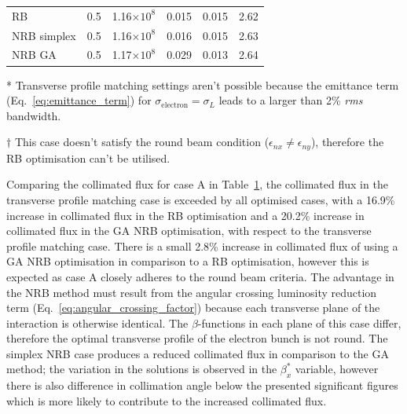 \documentclass[../main.tex]{subfiles}
\begin{document}
\begin{table}[!h]
{\begin{threeparttable}
\begin{tabular}{lccccc}
RB & 0.5 & 1.16$\times 10^{8}$ & 0.015 & 0.015 & 2.62  \\
NRB simplex & 0.5 & 1.16$\times 10^{8}$ & 0.016 & 0.015 & 2.63 \\
NRB GA & 0.5 & 1.17$\times 10^{8}$ & 0.029 & 0.013 & 2.64 \\
\hline\hline
\end{tabular}
\begin{tablenotes}[flushedleft]
\item[*]{Transverse profile matching settings aren't possible because the emittance term (Eq.~\ref{eq:emittance_term}) for $\sigma_{\mathrm{electron}} = \sigma_{L}$ leads to a larger than 2\% \textit{rms} bandwidth.}
\item[$\dagger$]{This case doesn't satisfy the round beam condition ($\epsilon_{nx} \neq \epsilon_{ny}$), therefore the RB optimisation can't be utilised.}
\end{tablenotes}
\end{threeparttable}}
\label{tab:single_point_optimisations}
\end{table}

Comparing the collimated flux for case A in Table~\ref{tab:single_point_optimisations}, the collimated flux in the transverse profile matching case is exceeded by all optimised cases, with a 16.9\% increase in collimated flux in the RB optimisation and a 20.2\% increase in collimated flux in the GA NRB optimisation, with respect to the transverse profile matching case. There is a small 2.8\% increase in collimated flux of using a GA NRB optimisation in comparison to a RB optimisation, however this is expected as case A closely adheres to the round beam criteria. The advantage in the NRB method must result from the angular crossing luminosity reduction term (Eq.~\ref{eq:angular_crossing_factor}) because each transverse plane of the interaction is otherwise identical. The $\beta$-functions in each plane of this case differ, therefore the optimal transverse profile of the electron bunch is not round. The simplex NRB case produces a reduced collimated flux in comparison to the GA method; the variation in the solutions is observed in the $\beta_{x}^{*}$ variable, however there is also difference in collimation angle below the presented significant figures which is more likely to contribute to the increased collimated flux. 
\end{document}
